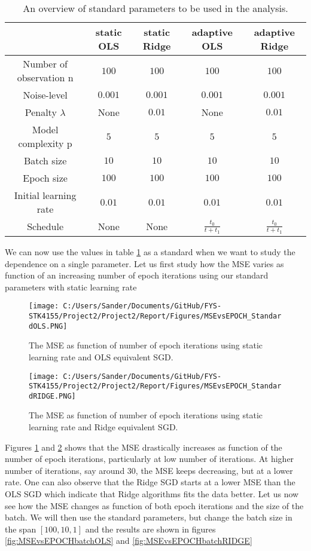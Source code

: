 \documentclass[12pt,a4paper]{article}
\begin{document}
\begin{table}[h]
\caption{\label{tab:standardParam} An overview of standard parameters to be used in the analysis.}
\centering
\begin{tabular}{c|c|c|c|c}
 & static OLS & static Ridge & adaptive OLS & adaptive Ridge\\
\hline
Number of observation n & $100$ & $100$ & $100$ & $100$\\
\hline
Noise-level & $0.001$ & $0.001$ & $0.001$ & $0.001$\\
\hline
Penalty $\lambda$ & None & $0.01$ & None & $0.01$\\
\hline
Model complexity p & $5$ & $5$ & $5$ & $5$\\
\hline
Batch size & $10$ & $10$ & $10$ & $10$\\
\hline
Epoch size & $100$ & $100$ & $100$ & $100$\\
\hline
Initial learning rate & $0.01$ & $0.01$ & $0.01$ & $0.01$\\
\hline
Schedule & None & None & $\frac{t_0}{t+t_1}$ & $\frac{t_0}{t+t_1}$\\
\end{tabular}
\end{table}

\noindent We can now use the values in table \ref{tab:standardParam} as a standard when we want to study the dependence on a single parameter. Let us first study how the MSE varies as function of an increasing number of epoch iterations using our standard parameters with static learning rate

\begin{figure}[H]
\centering
\texttt{[image: C:/Users/Sander/Documents/GitHub/FYS-STK4155/Project2/Project2/Report/Figures/MSEvsEPOCH\_StandardOLS.PNG]}
\caption{\label{fig:MSEvsEPOCHstandard} The MSE as function of number of epoch iterations using static learning rate and OLS equivalent SGD.}
\end{figure}

\begin{figure}[H]
\centering
\texttt{[image: C:/Users/Sander/Documents/GitHub/FYS-STK4155/Project2/Project2/Report/Figures/MSEvsEPOCH\_StandardRIDGE.PNG]}
\caption{\label{fig:MSEvsEPOCHstandardRidge} The MSE as function of number of epoch iterations using static learning rate and Ridge equivalent SGD.}
\end{figure}

\noindent Figures \ref{fig:MSEvsEPOCHstandard} and \ref{fig:MSEvsEPOCHstandardRidge} shows that the MSE drastically increases as function of the number of epoch iterations, particularly at low number of iterations. At higher number of iterations, say around 30, the MSE keeps decreasing, but at a lower rate. One can also observe that the Ridge SGD starts at a lower MSE than the OLS SGD which indicate that Ridge algorithms fits the data better. Let us now see how the MSE changes as function of both epoch iterations and the size of the batch. We will then use the standard parameters, but change the batch size in the span $[100, 10, 1]$ and the results are shown in figures \ref{fig:MSEvsEPOCHbatchOLS} and \ref{fig:MSEvsEPOCHbatchRIDGE}
\end{document}

